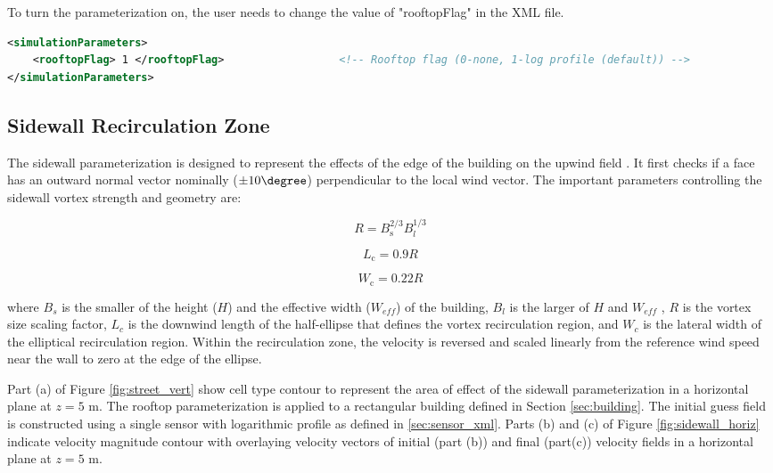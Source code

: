 To turn the parameterization on, the user needs to change the value of "rooftopFlag" in the XML file.

\begin{lstlisting}[language=XML]
<simulationParameters>
  	<rooftopFlag> 1 </rooftopFlag> 					<!-- Rooftop flag (0-none, 1-log profile (default)) -->
</simulationParameters>
\end{lstlisting}

\subsection{Sidewall Recirculation Zone}

The sidewall parameterization is designed to represent the effects of the edge of the building on the upwind field \cite{hayati2017comprehensive}. It first checks if a face has an outward normal vector nominally ($\pm 10\degree$)
perpendicular to the local wind vector. The important parameters controlling the sidewall vortex strength and geometry are:

\begin{equation}
R=B_{\mathrm{s}}^{2 / 3} B_{l}^{1 / 3}
\end{equation}

\begin{equation}
L_{\mathrm{c}}=0.9 R
\end{equation}

\begin{equation}
W_{\mathrm{c}}=0.22 R
\end{equation}

where $B_s$ is the smaller of the height ($H$) and the effective width ($W_{eff}$) of the
building, $B_l$ is the larger of $H$ and $W_{eff}$ , $R$ is the vortex size scaling factor, $L_c$ is the downwind length of the half-ellipse that defines the vortex recirculation region, and
$W_c$ is the lateral width of the elliptical recirculation region. Within the recirculation zone, the velocity is reversed and scaled linearly from the reference wind speed near the wall to zero at the edge of the ellipse.

Part (a) of Figure \ref{fig:street_vert} show cell type contour to represent the area of effect of the sidewall parameterization in a horizontal plane at $z=5$ m. The rooftop parameterization is applied to a rectangular building defined in Section \ref{sec:building}. The initial guess field is constructed using a single sensor with logarithmic profile as defined in \ref{sec:sensor_xml}. Parts (b) and (c) of Figure \ref{fig:sidewall_horiz} indicate velocity magnitude contour with overlaying velocity vectors of initial (part (b)) and final (part(c)) velocity fields in a horizontal plane at $z=5$ m.

